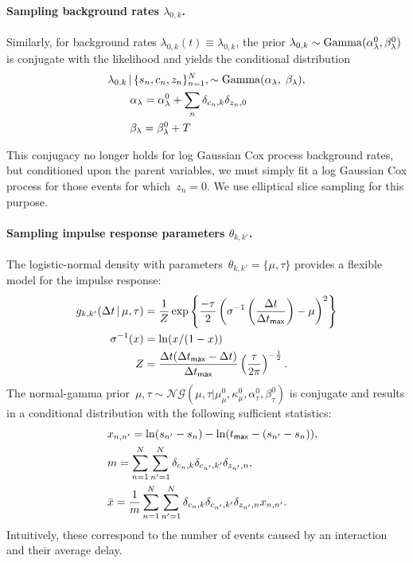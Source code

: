 \paragraph{Sampling background rates $\lambda_{0,k}$.} Similarly, for background rates ${\lambda_{0,k}(t)\equiv\lambda_{0,k}}$, the prior ${\lambda_{0,k} \sim \mathrm{Gamma}(\alpha_{\lambda}^0,\beta_{\lambda}^0)}$ is conjugate with the likelihood and yields the conditional distribution 
\begin{align*}
  &\lambda_{0,k}\,|\, \{s_n,c_n,z_n\}^N_{n=1},\sim \mathrm{Gamma}(\alpha_{\lambda},\;  \beta_\lambda),\\
  &\qquad \alpha_{\lambda} = \alpha^0_{\lambda} + \sum_n \delta_{c_n,k}\delta_{z_n,0}\\
  &\qquad \beta_\lambda = \beta_\lambda^0 + T
\end{align*}

This conjugacy no longer holds for log Gaussian Cox process background rates, but conditioned upon the parent variables, we must simply fit a log Gaussian Cox process for those events for which~${z_n=0}$. We use elliptical slice sampling \cite{Murray-2010} for this purpose. 

\paragraph{Sampling impulse response parameters $\theta_{k,k'}$.} The logistic-normal density with parameters~$\theta_{k,k'}=\{\mu,\tau\}$ provides a flexible model for the impulse response: 
\begin{align*}
g_{k,k'}(\Delta t\,|\, \mu,\tau)&=\frac{1}{Z}\exp\left\{\frac{-\tau}{2}\left(\sigma^{-1}\left(\frac{\Delta t}{\Delta t_{\mathsf{max}}}\right) - \mu\right)^2\right\}\\
\sigma^{-1}(x) &= \ln(x/(1-x))\\
Z &= \frac{\Delta t(\Delta t_{\sf{max}}-\Delta t)}{\Delta t_{\mathsf{max}}} \left(\frac{\tau}{2\pi}\right)^{-\frac{1}{2}}.
\end{align*}
The normal-gamma prior~${\mu,\tau \sim \mathcal{NG}(\mu,\tau|\mu_\mu^0,\kappa_\mu^0,\alpha_\tau^0,\beta_\tau^0)}$
is conjugate and results in a conditional distribution with the following sufficient statistics:
\begin{align*}
&\quad x_{n,n'} = \ln(s_{n'}-s_n)-\ln(t_{\sf{max}}-(s_{n'}-s_n)), \\
&\quad m = \sum_{n=1}^N\sum_{n'=1}^N \delta_{c_n,k}\delta_{c_{n'},k'}\delta_{z_{n'},n}, \\
&\quad\bar{x} = \frac{1}{m} \sum_{n=1}^N\sum_{n'=1}^N \delta_{c_n,k}\delta_{c_{n'},k'}\delta_{z_{n'},n}x_{n,n'}.
\end{align*}
Intuitively, these correspond to the number of events caused by an interaction and their average delay.

